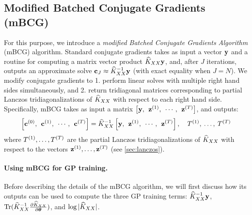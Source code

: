 \subsection{Modified Batched Conjugate Gradients (mBCG)}
\label{sec:mbcg}

For this purpose, we introduce a \emph{modified Batched Conjugate Gradients Algorithm} (mBCG) algorithm.
Standard conjugate gradients takes as input a vector $\mathbf{y}$ and a routine for computing a matrix vector product $\widehat{K}_{XX}\mathbf{y}$, and, after $J$ iterations, outputs an approximate solve $\mathbf{c}_{J} \approx \widehat{K}_{XX}^{-1}\mathbf{y}$ (with exact equality when $J = N$).
We modify conjugate gradients to 1. perform linear solves with multiple right hand sides simultaneously, and 2. return tridiagonal matrices corresponding to partial Lanczos tridiagonalizations of $\widehat{K}_{XX}$ with respect to each right hand side.
Specifically, mBCG takes as input a matrix $\left[ \mathbf{y}, \:\: \mathbf{z}^{(1)}, \:\: \cdots, \:\: \mathbf{z}^{(T)} \right]$, and outputs:
\begin{equation}
  \label{eqn:mod_cg_call}
  \left[ \mathbf{c}^{(0)}, \:\: \mathbf{c}^{(1)}, \:\: \cdots, \:\: \mathbf{c}^{(T)} \right] = \widehat{K}_{XX}^{-1} \left[ \mathbf{y}, \:\: \mathbf{z}^{(1)}, \:\: \cdots, \:\: \mathbf{z}^{(T)} \right], \quad T^{(1)}, \: \ldots, \: T^{(T)}
\end{equation}
where $T^{(1)}, \ldots, T^{(T)}$ are the partial Lanczos tridiagonalizations of $\widehat{K}_{XX}$ with respect to the vectors $\mathbf{z}^{(1)}, \ldots, \mathbf{z}^{(T)}$ (see \cref{sec:lanczos}).

\paragraph{Using mBCG for GP training.}
Before describing the details of the mBCG algorithm, we will first discuss how its outputs can be used to compute the three GP training terms:
$\widehat{K}_{XX}^{-1} \mathbf{y}$, $\tr{ \trainK^{-1} \frac{\partial \trainK}{\partial \btheta} }$, and $\log \vert \widehat{K}_{XX} \vert$.

